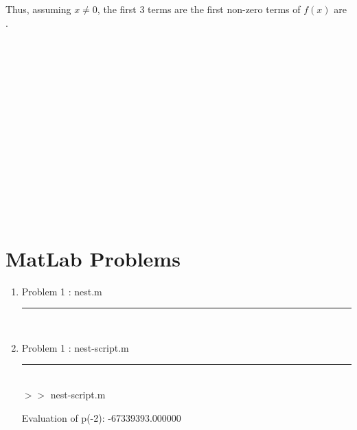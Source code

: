 \documentclass[12pt]{article}
\begin{document}
\begin{enumerate}
	Thus, assuming $x \neq 0$, the first 3 terms are the first non-zero terms of $f(x)$ are .
	\\ \\ \\ \\ \\ \\ \\ \\ \\ \\ \\ \\ \\ \\ \\
\end{enumerate} 

\section*{MatLab Problems}

	\begin{enumerate}
	
	\item[] Problem 1 : nest.m \noindent\rule{\textwidth}{1.0pt} \\
	
	
	\item[] Problem 1 : nest-script.m \noindent\rule{\textwidth}{1.0pt} \\
		
	
	$>>$ nest-script.m 
	\begin{framed}
	Evaluation of p(-2): -67339393.000000
	\end{framed}
	
	\end{enumerate}
	
\pagebreak	
	
\end{document}

